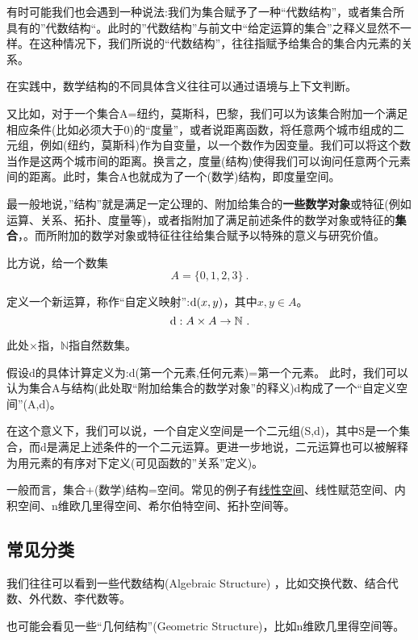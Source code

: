 有时可能我们也会遇到一种说法:我们为集合赋予了一种“代数结构”，或者集合所具有的”代数结构“。此时的”代数结构”与前文中“给定运算的集合”之释义显然不一样。在这种情况下，我们所说的“代数结构”，往往指赋予给集合的集合内元素的关系。

在实践中，数学结构的不同具体含义往往可以通过语境与上下文判断。

又比如，对于一个集合A={纽约，莫斯科，巴黎}，我们可以为该集合附加一个满足相应条件(比如必须大于0)的“度量”，或者说距离函数，将任意两个城市组成的二元组，例如(纽约，莫斯科)作为自变量，以一个数作为因变量。我们可以将这个数当作是这两个城市间的距离。换言之，度量(结构)使得我们可以询问任意两个元素间的距离。此时，集合A也就成为了一个(数学)结构，即度量空间。

最一般地说，”结构”就是满足一定公理的、附加给集合的\textbf{一些数学对象}或特征(例如运算、关系、拓扑、度量等)，或者指附加了满足前述条件的数学对象或特征的\textbf{集合}，。而所附加的数学对象或特征往往给集合赋予以特殊的意义与研究价值。

比方说，给一个数集
\begin{equation}
 A = \{ 0,1,2,3 \}~.
\end{equation}

定义一个新运算，称作“自定义映射”:${\rm d}(x,y)$，其中$x,y\in A$。
\begin{equation}
 {\rm d}:A \times A  \to {\mathbb N}~.
\end{equation}

此处$\times$指，${\mathbb N}$指自然数集。

假设d的具体计算定义为:d(第一个元素,任何元素)=第一个元素。
此时，我们可以认为集合A与结构(此处取“附加给集合的数学对象”的释义)d构成了一个“自定义空间”(A,d)。

在这个意义下，我们可以说，一个自定义空间是一个二元组(S,d)，其中S是一个集合，而d是满足上述条件的一个二元运算。更进一步地说，二元运算也可以被解释为用元素的有序对下定义(可见函数的”关系”定义)。

一般而言，集合+(数学)结构=空间。常见的例子有\href{https://wuli.wiki/online/LSpace.html}{线性空间}、线性赋范空间、内积空间、n维欧几里得空间、希尔伯特空间、拓扑空间等。

\subsection{常见分类}
我们往往可以看到一些代数结构(Algebraic Structure) ，比如交换代数、结合代数、外代数、李代数等。

也可能会看见一些“几何结构”(Geometric Structure)，比如n维欧几里得空间等。

